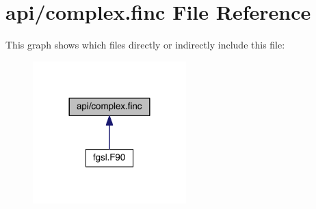 \hypertarget{complex_8finc}{\section{api/complex.finc File Reference}
\label{complex_8finc}
}
This graph shows which files directly or indirectly include this file\-:\nopagebreak
\begin{figure}[H]
\begin{center}
\leavevmode
\includegraphics[width=168pt]{complex_8finc__dep__incl}
\end{center}
\end{figure}
